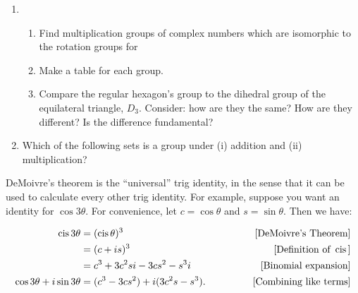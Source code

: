 \documentclass[../gatm.tex]{subfiles}
\begin{document}
\begin{enumerate}
\item \begin{enumerate}
\item Find multiplication groups of complex numbers which are isomorphic to the rotation groups for
\begin{enumerate}
\end{enumerate}
\item Make a table for each group.
\item Compare the regular hexagon's group to the dihedral group of the equilateral triangle, $D_3$. Consider: how are they the same? How are they different? Is the difference fundamental?
\end{enumerate}
\item Which of the following sets is a group under (i) addition and (ii) multiplication?
\begin{enumerate}
\end{enumerate}

\setcounter{cg_problem_i}{\value{enumi}}
\end{enumerate}

\noindent DeMoivre's theorem is the ``universal'' trig identity, in the sense that it can be used to calculate every other trig identity. For example, suppose you want an identity for $\cos 3\theta$. For convenience, let $c=\cos\theta$ and $s=\sin\theta$. Then we have:

\begin{align*}
\operatorname{cis} 3\theta &= (\operatorname{cis} \theta)^3  & \qquad \text{[DeMoivre's Theorem]} \\
&= (c+is)^3 & \qquad \text{[Definition of } \operatorname{cis} \text{]} \\
&= c^3 + 3c^2s i - 3cs^2 - s^3 i & \qquad \text{[Binomial expansion]} \\
\cos 3\theta + i\sin 3\theta &= (c^3 - 3cs^2) + i (3c^2 s - s^3). \qquad & \text{[Combining like terms]}
\end{align*}
\end{document}
